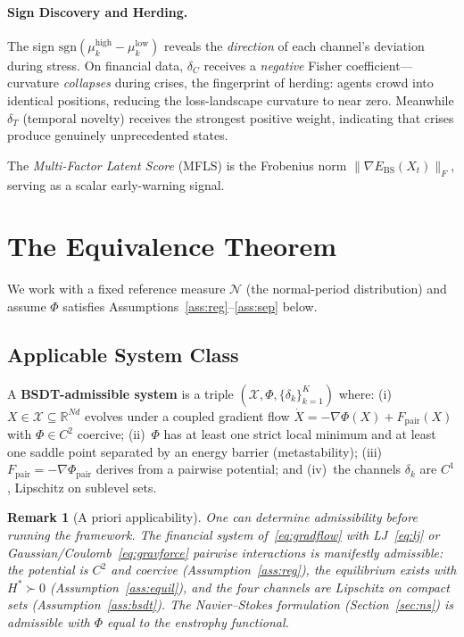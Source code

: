\documentclass[final]{siamltex}
\newcommand{\R}{\mathbb{R}}
\newcommand{\norm}[1]{\lVert #1 \rVert}
\providecommand{\grad}{\nabla}
\newcommand{\Ebs}{E_{\mathrm{BS}}}
\newtheorem{remark}[theorem]{Remark}
\begin{document}
\paragraph{Sign Discovery and Herding.}
The sign $\mathrm{sgn}(\mu_k^{\mathrm{high}}-\mu_k^{\mathrm{low}})$
reveals the \emph{direction} of each channel's deviation during
stress.  On financial data, $\delta_C$ receives a \emph{negative}
Fisher coefficient---curvature \emph{collapses} during crises,
the fingerprint of herding: agents crowd into identical positions,
reducing the loss-landscape curvature to near zero.  Meanwhile
$\delta_T$ (temporal novelty) receives the strongest positive
weight, indicating that crises produce genuinely unprecedented
states.

The \emph{Multi-Factor Latent Score} (MFLS) is the Frobenius norm
$\norm{\grad\Ebs(X_t)}_F$, serving as a scalar early-warning
signal.


\section{The Equivalence Theorem}\label{sec:equiv}

We work with a fixed reference measure $\mathcal{N}$ (the
normal-period distribution) and assume $\Phi$ satisfies
Assumptions~\ref{ass:reg}--\ref{ass:sep} below.

\subsection{Applicable System Class}

\begin{definition}\label{def:admissible}
A \textbf{BSDT-admissible system} is a triple
$(\mathcal{X}, \Phi, \{\delta_k\}_{k=1}^K)$ where:
(i)~$X \in \mathcal{X}\subseteq\R^{Nd}$ evolves under a coupled
gradient flow $\dot{X} = -\grad\Phi(X) + F_{\mathrm{pair}}(X)$
with $\Phi\in C^2$ coercive;
(ii)~$\Phi$ has at least one strict local minimum and at least
one saddle point separated by an energy barrier (metastability);
(iii)~$F_{\mathrm{pair}} = -\grad\Phi_{\mathrm{pair}}$ derives from
a pairwise potential; and
(iv)~the channels $\delta_k$ are $C^1$, Lipschitz on sublevel sets.
\end{definition}

\begin{remark}[A priori applicability]\label{rem:apriori}
One can determine admissibility \emph{before} running the
framework.  The financial system of~\eqref{eq:gradflow} with
LJ~\eqref{eq:lj} or Gaussian/Coulomb~\eqref{eq:gravforce} pairwise
interactions is manifestly admissible: the potential is $C^2$ and
coercive (Assumption~\ref{ass:reg}), the equilibrium exists with
$H^*\succ 0$ (Assumption~\ref{ass:equil}), and the four channels
are Lipschitz on compact sets (Assumption~\ref{ass:bsdt}).
The Navier--Stokes formulation (Section~\ref{sec:ns}) is admissible
with $\Phi$ equal to the enstrophy functional.
\end{remark}
\end{document}
